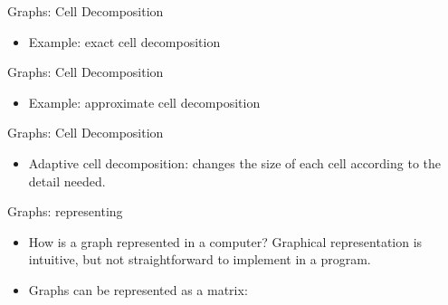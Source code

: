 \documentclass[compress]{beamer}
\begin{document}
\begin{frame}{Graphs: Cell Decomposition}

\begin{itemize}
\item Example: exact cell decomposition
\end{itemize}

\end{frame}

\begin{frame}{Graphs: Cell Decomposition}

\begin{itemize}
\item Example: approximate cell decomposition
\end{itemize}

\end{frame}

\begin{frame}{Graphs: Cell Decomposition}

\begin{itemize}
\item Adaptive cell decomposition: changes the size of each cell according
  to the detail needed.
\end{itemize}

\end{frame}

\begin{frame}{Graphs: representing}

\begin{itemize}
\item How is a graph represented in a computer? Graphical representation is
  intuitive, but not straightforward to implement in a program.
\item Graphs can be represented as a matrix:
\end{itemize}



\end{frame}
\end{document}
